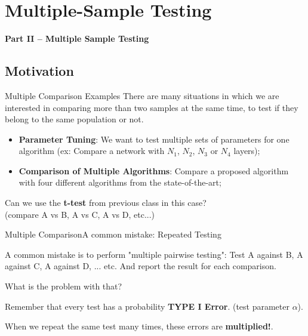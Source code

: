 \section{Multiple-Sample Testing}

\begin{frame}{}
  \centering
  {\bf Part II -- Multiple Sample Testing}
\end{frame}

\subsection{Motivation}

\begin{frame}{Multiple Comparison Examples}
  There are many situations in which we are interested in comparing more than two samples at the same time, to test if they belong to the same population or not.\bigskip

  \begin{itemize}
    \item {\bf Parameter Tuning}: We want to test multiple sets of parameters for one algorithm (ex: Compare a network with $N_1$, $N_2$, $N_3$ or $N_4$ layers);
    \item {\bf Comparison of Multiple Algorithms}: Compare a proposed algorithm with four different algorithms from the state-of-the-art;
  \end{itemize}\bigskip

  Can we use the {\bf t-test} from previous class in this case?\\
  (compare A vs B, A vs C, A vs D, etc...)
\end{frame}

\begin{frame}{Multiple Comparison}{A common mistake: Repeated Testing}

  A \alert{common mistake} is to perform "multiple pairwise testing": Test A against B, A against C, A against D, ... etc. And report the result for each comparison.\bigskip

  What is the problem with that?\bigskip

  Remember that every test has a probability {\bf TYPE I Error}. (test parameter $\alpha$).\bigskip

  When we repeat the same test many times, these errors are {\bf multiplied!}.
\end{frame}

